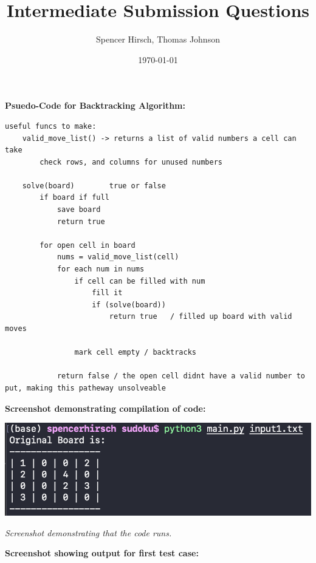 \documentclass{article}
\begin{document}
\title{\textbf{Intermediate Submission Questions}}
\author{Spencer Hirsch, Thomas Johnson}
\date{\today}

\maketitle

\textbf{Psuedo-Code for Backtracking Algorithm:}

\medskip

\begin{lstlisting}[frame=single]
    useful funcs to make:
    valid_move_list() -> returns a list of valid numbers a cell can take
        check rows, and columns for unused numbers

    solve(board)        true or false
        if board if full
            save board
            return true

        for open cell in board
            nums = valid_move_list(cell)
            for each num in nums
                if cell can be filled with num
                    fill it
                    if (solve(board))
                        return true   / filled up board with valid moves

                mark cell empty / backtracks

            return false / the open cell didnt have a valid number to put, making this patheway unsolveable
\end{lstlisting}

\pagebreak


\textbf{Screenshot demonstrating compilation of code:}

\bigskip

\includegraphics{compilation.png}

\textit{Screenshot demonstrating that the code runs.}

\pagebreak

\textbf{Screenshot showing output for first test case:}

\bigskip
\end{document}
